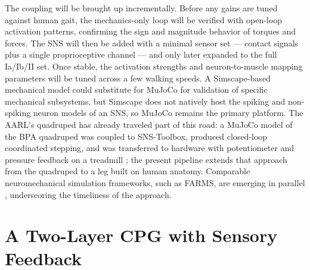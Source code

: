 The coupling will be brought up incrementally. Before any gains are tuned against human gait, the mechanics-only loop will be verified with open-loop activation patterns, confirming the sign and magnitude behavior of torques and forces. The SNS will then be added with a minimal sensor set --- contact signals plus a single proprioceptive channel --- and only later expanded to the full Ia/Ib/II set. Once stable, the activation strengths and neuron-to-muscle mapping parameters will be tuned across a few walking speeds. A Simscape-based mechanical model could substitute for MuJoCo for validation of specific mechanical subsystems, but Simscape does not natively host the spiking and non-spiking neuron models of an SNS, so MuJoCo remains the primary platform. The AARL's quadruped has already traveled part of this road: a MuJoCo model of the BPA quadruped was coupled to SNS-Toolbox, produced closed-loop coordinated stepping, and was transferred to hardware with potentiometer and pressure feedback on a treadmill \citep{lutz_mechanical_2025}; the present pipeline extends that approach from the quadruped to a leg built on human anatomy. Comparable neuromechanical simulation frameworks, such as FARMS, are emerging in parallel \citep{arreguit_farms_2023}, underscoring the timeliness of the approach.

\section{A Two-Layer CPG with Sensory Feedback}\label{sec:fw_cpg}

